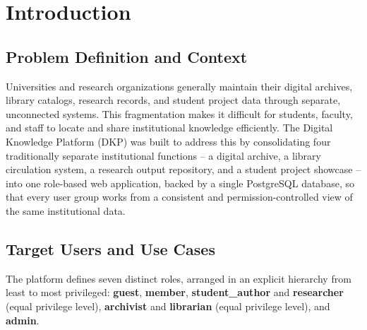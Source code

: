 \documentclass[12pt]{article}
\begin{document}
\bigskip
\tableofcontents
\newpage

\section{Introduction}

\subsection{Problem Definition and Context}
Universities and research organizations generally maintain their digital archives, library catalogs, research records, and student project data through separate, unconnected systems. This fragmentation makes it difficult for students, faculty, and staff to locate and share institutional knowledge efficiently. The Digital Knowledge Platform (DKP) was built to address this by consolidating four traditionally separate institutional functions -- a digital archive, a library circulation system, a research output repository, and a student project showcase -- into one role-based web application, backed by a single PostgreSQL database, so that every user group works from a consistent and permission-controlled view of the same institutional data.

\subsection{Target Users and Use Cases}
The platform defines seven distinct roles, arranged in an explicit hierarchy from least to most privileged: \textbf{guest}, \textbf{member}, \textbf{student\_author} and \textbf{researcher} (equal privilege level), \textbf{archivist} and \textbf{librarian} (equal privilege level), and \textbf{admin}.
\end{document}
